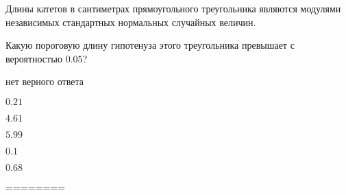
\begin{question}
Длины катетов в сантиметрах прямоугольного треугольника являются
модулями независимых стандартных нормальных случайных величин.

Какую пороговую длину гипотенуза этого треугольника превышает с
вероятностью \(0.05\)?
\begin{answerlist}
  \item нет верного ответа
  \item \(0.21\)
  \item \(4.61\)
  \item \(5.99\)
  \item \(0.1\)
  \item \(0.68\)
\end{answerlist}
\end{question}

\begin{solution}
========
\end{solution}

